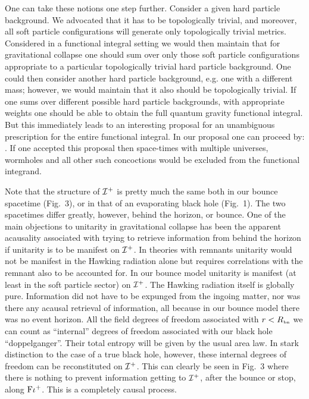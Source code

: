 One can take these notions one step further. Consider a given hard
particle background. We advocated that it has to be topologically
trivial, and moreover, all soft particle configurations will generate
only topologically trivial metrics. Considered in a functional integral
setting we would then maintain that for gravitational collapse one
should sum over only those soft particle configurations appropriate to
a particular topologically trivial hard particle background. One could
then consider another hard particle background, e.g. one with a
different mass; however, we would maintain that it also should be
topologically trivial. If one sums over different possible hard
particle backgrounds, with appropriate weights one should be able to
obtain the full quantum gravity functional integral. But this
immediately leads to an interesting proposal for an unambiguous
prescription for the entire functional integral.
In our proposal one can proceed by:
\smallskip
{}.
\smallskip
\noindent If one accepted this proposal then space-times with
multiple universes, wormholes
and all other such concoctions would be excluded from the functional
integrand.

Note that the structure of ${\cal I}^+$ is pretty much the same both in
our bounce spacetime (Fig.~3), or in that of an evaporating black hole
(Fig.~1). The two spacetimes differ greatly, however, behind the horizon,
or bounce. One of the main objections to unitarity in gravitational
collapse has been the apparent acausality associated with trying to
retrieve information from behind the horizon if unitarity is to be
manifest on ${\cal I}^+$. In theories with remnants unitarity would not
be manifest in the Hawking radiation alone but requires correlations
with the remnant also to be accounted for. In our bounce model
unitarity is manifest (at least in the soft particle sector) on ${\cal
I}^+$. The Hawking radiation itself is globally pure. Information did
not have to be expunged from the ingoing matter, nor was there any
acausal retrieval of information, all because in our bounce model there
was no event horizon. All the field degrees of freedom associated with
$r<R_{\scriptscriptstyle{\rm bn}}$ we can count as ``internal'' degrees of freedom associated
with our black hole ``doppelganger''. Their total entropy will be given
by the usual area law. In stark distinction to the case of a true black
hole, however, these internal degrees of freedom can be reconstituted
on ${\cal I}^+$. This can clearly be seen in Fig.~3 where there is
nothing to prevent information getting to ${\cal I}^+$, after the
bounce or stop, along ${\rm F}\iota^+$. This is a completely causal
process.

